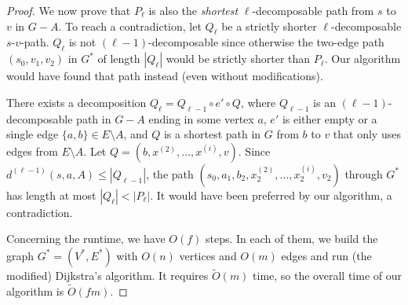 \documentclass{theoretics}
\newcommand*{\Otilde}{\widetilde{O}}
\newcommand*{\length}[1]{|#1|}
\renewcommand{\le}{\leqslant}
\begin{document}
\begin{proof}
We now prove that $P_{\ell}$ is also the \emph{shortest} $\ell$-decomposable path from $s$ to $v$
in $G{-}A$.
To reach a contradiction, let $Q_{\ell}$ be a strictly shorter $\ell$-decomposable $s$-$v$-path.
$Q_{\ell}$ is not $(\ell{-}1)$-decomposable
since otherwise the two-edge path $(s_0,v_1,v_2)$ in $G^*$ of length $\length{Q_{\ell}}$ 
would be strictly shorter than $P_\ell$.
Our algorithm would have found that path instead (even without modifications).

There exists a decomposition $Q_\ell = Q_{\ell-1} \circ e' \circ Q$,
where $Q_{\ell-1}$ is an $(\ell{-}1)$-decomposable path in $G-A$ ending in some vertex $a$,
$e'$ is either empty or a single edge $\{a,b\} \in E{\setminus}A$,
and $Q$ is a shortest path in $G$ from $b$ to $v$ that only uses edges from $E{\setminus}A$.
Let $Q = (b,x^{(2)}, \dots, x^{(i)},v)$.
Since $d^{(\ell-1)}(s, a, A) \le \length{Q_{\ell-1}}$,
the path $(s_0,a_1,b_2,x^{(2)}_2, \dots, x^{(i)}_2, v_2)$ through $G^*$
has length at most $\length{Q_\ell} < \length{P_\ell}$.
It would have been preferred by our algorithm,
a contradiction.

Concerning the runtime, we have $O(f)$ steps. 
In each of them, we build the graph $G^*=(V^*,E^*)$ with $O(n)$ vertices and $O(m)$ edges 
and run (the modified) Dijkstra's algorithm.
It requires $\Otilde(m)$ time,
so the overall time of our algorithm is $\Otilde(fm)$.
\end{proof}
\end{document}
